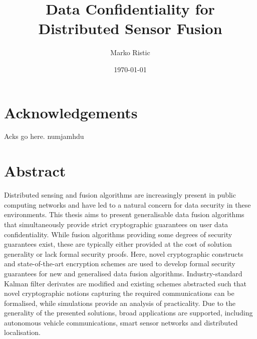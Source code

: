 \documentclass[oneside]{scrbook}
\title{Data Confidentiality for Distributed Sensor Fusion}
\author{Marko Ristic}
\date{\today}
\theoremstyle{definition}
\theoremstyle{definition}
\theoremstyle{remark}
\begin{document}
\maketitle

\frontmatter
\tableofcontents

% 
%                                     
%                                     
%                                     
% 
\chapter{Acknowledgements}
Acks go here. numjamhdu

% 
%                                                                
%                                                                
%                                                                
% 
\chapter{Abstract}
Distributed sensing and fusion algorithms are increasingly present in public computing networks and have led to a natural concern for data security in these environments. This thesis aims to present generalisable data fusion algorithms that simultaneously provide strict cryptographic guarantees on user data confidentiality. While fusion algorithms providing some degrees of security guarantees exist, these are typically either provided at the cost of solution generality or lack formal security proofs. Here, novel cryptographic constructs and state-of-the-art encryption schemes are used to develop formal security guarantees for new and generalised data fusion algorithms. Industry-standard Kalman filter derivates are modified and existing schemes abstracted such that novel cryptographic notions capturing the required communications can be formalised, while simulations provide an analysis of practicality. Due to the generality of the presented solutions, broad applications are supported, including autonomous vehicle communications, smart sensor networks and distributed localisation.
\end{document}
